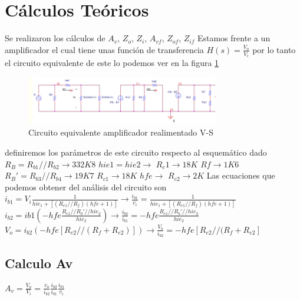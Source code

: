 \documentclass[12pt, letterpaper]{article}
\begin{document}
\section{Cálculos Teóricos}
Se realizaron los cálculos de $A_v$, $Z_o$, $Z_i$, $A_{vf}$, $Z_{of}$, $Z_{if}$
\singlespacing
Estamos frente a un amplificador el cual tiene unas función de transferencia $H(s)=\frac{V_o}{V_i}
$ por lo tanto el circuito equivalente de este lo podemos ver en la figura \ref{fig:2.1}
\begin{figure}[h]
    \centering
    \includegraphics[width=0.75\textwidth]{Imagenes/Screenshot_57.png}
    \caption{Circuito equivalente amplificador realimentado V-S}
    \label{fig:2.1}
\end{figure}
\singlespacing
definiremos los parámetros de este circuito respecto al esquemático dado 
\singlespacing
$R_B=R_{b1}//R_{b2} \rightarrow 332K8$\hspace{1cm} $hie1=hie2 \rightarrow$\hspace{1cm} $R_e1 \rightarrow 18K$
\singlespacing
$Rf \rightarrow 1K6$ \hspace{1cm} $R_B'=R_{b3}//R_{b4} \rightarrow 19K7$ \hspace{1cm} $R_{c1} \rightarrow18K$ 
\singlespacing
$hfe \rightarrow $ \hspace{1cm} $R_{c2} \rightarrow 2K$
\singlespacing
Las ecuaciones que podemos obtener del análisis del circuito son
\singlespacing
$i_{b1}=V_i\frac{1}{hie_1+[(R_{e1}//R_f)(hfe + 1)]} \rightarrow \frac{i_{b1}}{v_i}=\frac{1}{hie_1+[(R_{e1}//R_f)(hfe + 1)]}$
\singlespacing
$ i_{b2}=ib1(-hfe\frac{R_{e1}//R_b'//hie_2}{hie_2}) \rightarrow \frac{i_{b2}}{i_{b1}}=-hfe\frac{R_{e1}//R_b'//hie_2}{hie_2}$ 
\singlespacing
$V_o=i_{b2}(-hfe[R_{e2}//(R_f+R_{e2})]) \rightarrow \frac{V_o}{i_{b2}}=-hfe[R_{e2}//(R_f+R_{e2}]$
\subsection{Calculo Av}
$A_v=\frac{V_o}{V_i}=\frac{v_o}{i_{b2}}\frac{i_{b2}}{i_{b1}}\frac{i_{b1}}{v_i}$
\end{document}

